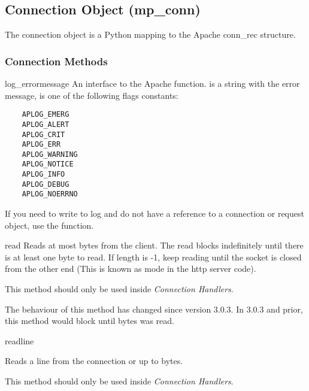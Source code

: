 \subsection{Connection Object (mp_conn)\label{pyapi-mpconn}}

The connection object is a Python mapping to the Apache conn_rec
structure.

\subsubsection{Connection Methods\label{pyapi-mpconn-meth}}

\begin{methoddesc}[connection]{log_error}{message}
  An interface to the Apache 
  function.  is a string with the error message,
   is one of the following flags constants:

  \begin{verbatim}
    APLOG_EMERG
    APLOG_ALERT
    APLOG_CRIT
    APLOG_ERR
    APLOG_WARNING
    APLOG_NOTICE
    APLOG_INFO
    APLOG_DEBUG
    APLOG_NOERRNO
  \end{verbatim}            

  If you need to write to log and do not have a reference to a connection or
  request object, use the  function.
\end{methoddesc}

\begin{methoddesc}[connection]{read}{}
  Reads at most  bytes from the client. The read blocks
  indefinitely until there is at least one byte to read. If length is
  -1, keep reading until the socket is closed from the other end (This
  is known as  mode in the http server code).

  This method should only be used inside \emph{Connection Handlers}.

  \begin{notice}
    The behaviour of this method has changed since version 3.0.3. In
    3.0.3 and prior, this method would block until  bytes
    was read.
  \end{notice}

\end{methoddesc}

\begin{methoddesc}[connection]{readline}{}

  Reads a line from the connection or up to  bytes.

  This method should only be used inside \emph{Connection Handlers}.

\end{methoddesc}

